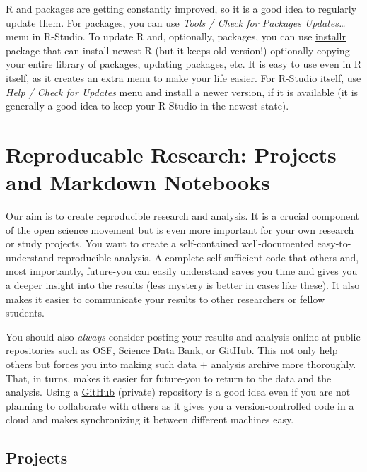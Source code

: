 \documentclass[
]{book}
\begin{document}
R and packages are getting constantly improved, so it is a good idea to regularly update them. For packages, you can use \emph{Tools / Check for Packages Updates\ldots{}} menu in R-Studio. To update R and, optionally, packages, you can use \href{https://www.r-project.org/nosvn/pandoc/installr.html}{installr} package that can install newest R (but it keeps old version!) optionally copying your entire library of packages, updating packages, etc. It is easy to use even in R itself, as it creates an extra menu to make your life easier. For R-Studio itself, use \emph{Help / Check for Updates} menu and install a newer version, if it is available (it is generally a good idea to keep your R-Studio in the newest state).

\hypertarget{reproducable-research}{%
\chapter{Reproducable Research: Projects and Markdown Notebooks}\label{reproducable-research}}

Our aim is to create reproducible research and analysis. It is a crucial component of the open science movement but is even more important for your own research or study projects. You want to create a self-contained well-documented easy-to-understand reproducible analysis. A complete self-sufficient code that others and, most importantly, future-you can easily understand saves you time and gives you a deeper insight into the results (less mystery is better in cases like these). It also makes it easier to communicate your results to other researchers or fellow students.

You should also \emph{always} consider posting your results and analysis online at public repositories such as \href{https://osf.io/}{OSF}, \href{https://www.scidb.cn/en}{Science Data Bank}, or \href{https://github.com/}{GitHub}. This not only help others but forces you into making such data + analysis archive more thoroughly. That, in turns, makes it easier for future-you to return to the data and the analysis. Using a \href{https://github.com/}{GitHub} (private) repository is a good idea even if you are not planning to collaborate with others as it gives you a version-controlled code in a cloud and makes synchronizing it between different machines easy.

\hypertarget{projects}{%
\section{Projects}\label{projects}}
\end{document}
